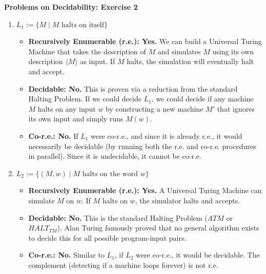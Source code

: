 \documentclass{article}
\theoremstyle{theorem}
\theoremstyle{definition}
\theoremstyle{remark}
\begin{document}
\textbf{Problems on Decidability: Exercise 2}
\begin{enumerate}
    \item \textbf{$L_1 := \{M \mid M \text{ halts on itself}\}$}
    \begin{itemize}
        \item \textbf{Recursively Enumerable (r.e.): Yes.} We can build a Universal Turing Machine that takes the description of $M$ and simulates $M$ using its own description $\langle M \rangle$ as input. If $M$ halts, the simulation will eventually halt and accept.
        \item \textbf{Decidable: No.} This is proven via a reduction from the standard Halting Problem. If we could decide $L_1$, we could decide if any machine $M$ halts on any input $w$ by constructing a new machine $M'$ that ignores its own input and simply runs $M(w)$.
        \item \textbf{Co-r.e.: No.} If $L_1$ were co-r.e., and since it is already r.e., it would necessarily be decidable (by running both the r.e. and co-r.e. procedures in parallel). Since it is undecidable, it cannot be co-r.e.
    \end{itemize}

    \item \textbf{$L_2 := \{(M, w) \mid M \text{ halts on the word } w\}$}
    \begin{itemize}
        \item \textbf{Recursively Enumerable (r.e.): Yes.} A Universal Turing Machine can simulate $M$ on $w$. If $M$ halts on $w$, the simulator halts and accepts.
        \item \textbf{Decidable: No.} This is the standard Halting Problem ($ATM$ or $HALT_{TM}$). Alan Turing famously proved that no general algorithm exists to decide this for all possible program-input pairs.
        \item \textbf{Co-r.e.: No.} Similar to $L_1$, if $L_2$ were co-r.e., it would be decidable. The complement (detecting if a machine loops forever) is not r.e.
    \end{itemize}


\end{enumerate}
\end{document}

